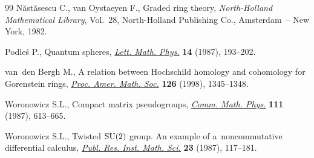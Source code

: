 \documentclass[pdftex]{sigma}
\numberwithin{equation}{section}
\begin{document}
\begin{thebibliography}{99}
N{\u{a}}st{\u{a}}sescu C., van Oystaeyen F., Graded ring theory,
 \textit{North-Holland Mathematical Library}, Vol.~28, North-Holland
 Publishing Co., Amsterdam~-- New York, 1982.

Podle{\'s} P., Quantum spheres, \href{http://dx.doi.org/10.1007/BF00416848}{\textit{Lett. Math. Phys.}} \textbf{14} (1987),
 193--202.

van~den Bergh M., A relation between {H}ochschild homology and cohomology for
 {G}orenstein rings, \href{http://dx.doi.org/10.1090/S0002-9939-98-04210-5}{\textit{Proc. Amer. Math. Soc.}} \textbf{126} (1998),
 1345--1348.

Woronowicz S.L., Compact matrix pseudogroups, \href{http://dx.doi.org/10.1007/BF01219077}{\textit{Comm. Math. Phys.}}
 \textbf{111} (1987), 613--665.

Woronowicz S.L., Twisted {${\rm SU}(2)$} group. {A}n example of
 a~noncommutative dif\/ferential calculus, \href{http://dx.doi.org/10.2977/prims/1195176848}{\textit{Publ. Res. Inst. Math. Sci.}}
 \textbf{23} (1987), 117--181.

\end{thebibliography}\LastPageEnding
\end{document}
